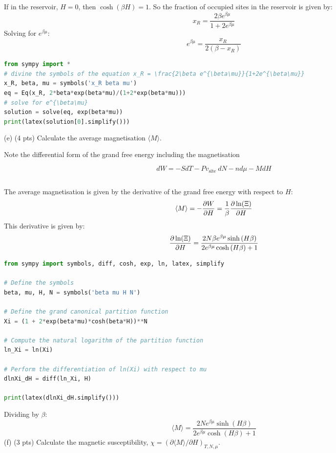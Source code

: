 \documentclass[10pt]{article}
\begin{document}
\subsection{}
If in the reservoir, $H=0$, then $\cosh(\beta H) = 1$. So the fraction of occupied sites in the reservoir is given by:
\begin{equation}
  x_R = \frac{2\beta e^{\beta\mu}}{1+2e^{\beta\mu}}
\end{equation}
Solving for $e^{\beta\mu}$:
\begin{equation}
  e^{\beta\mu} = \frac{x_{R}}{2 \left(\beta - x_{R}\right)}
\end{equation}
\begin{lstlisting}[language=Python]
from sympy import *
# divine the symbols of the equation x_R = \frac{2\beta e^{\beta\mu}}{1+2e^{\beta\mu}}
x_R, beta, mu = symbols('x_R beta mu')
eq = Eq(x_R, 2*beta*exp(beta*mu)/(1+2*exp(beta*mu)))
# solve for e^{\beta\mu}
solution = solve(eq, exp(beta*mu))
print(latex(solution[0].simplify()))
\end{lstlisting}
(e) (4 pts) Calculate the average magnetisation $\langle M\rangle$.

Note the differential form of the grand free energy including the magnetisation

$$
d W=-S d T-P v_{\text {site }} d N-n d \mu-M d H
$$
\subsection{}
The average magnetisation is given by the derivative of the grand free energy with respect to $H$:
\begin{equation}
  \langle M \rangle = -\pdv{W}{H} = \frac{1}{\beta } \pdv{\ln(\Xi)}{H}
\end{equation}
This derivative is given by:
\begin{equation}
  \pdv{\ln(\Xi)}{H} = \frac{2 N \beta e^{\beta \mu} \sinh{\left(H \beta \right)}}{2 e^{\beta \mu} \cosh{\left(H \beta \right)} + 1}
\end{equation}
\begin{lstlisting}[language=Python]
from sympy import symbols, diff, cosh, exp, ln, latex, simplify

# Define the symbols
beta, mu, H, N = symbols('beta mu H N')

# Define the grand canonical partition function
Xi = (1 + 2*exp(beta*mu)*cosh(beta*H))**N

# Compute the natural logarithm of the partition function
ln_Xi = ln(Xi)

# Perform the differentiation of ln(Xi) with respect to mu
dlnXi_dH = diff(ln_Xi, H)

print(latex(dlnXi_dH.simplify()))

\end{lstlisting}
Dividing by $\beta$:
\begin{equation}
  \langle M \rangle = \frac{2N e^{\beta \mu} \sinh{\left(H \beta \right)}}{2 e^{\beta \mu} \cosh{\left(H \beta \right)} + 1}
\end{equation}
(f) (3 pts) Calculate the magnetic susceptibility, $\chi=(\partial\langle M\rangle / \partial H)_{T, N, \mu}$.
\end{document}
